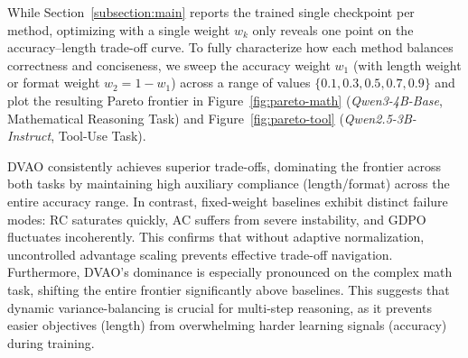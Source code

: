 \documentclass{llmxive}
\begin{document}
While Section~\ref{subsection:main} reports the trained single checkpoint per method, optimizing with a single weight $w_k$ only reveals one point on the accuracy--length trade-off curve. To fully characterize how each method balances correctness and conciseness, we sweep the accuracy weight $w_1$ (with length weight or format weight $w_2 = 1 - w_1$) across a range of values $\{0.1, 0.3, 0.5, 0.7, 0.9\}$ and plot the resulting Pareto frontier in Figure~\ref{fig:pareto-math} (\textit{Qwen3-4B-Base}, Mathematical Reasoning Task) and Figure~\ref{fig:pareto-tool} (\textit{Qwen2.5-3B-Instruct}, Tool-Use Task).

DVAO consistently achieves superior trade-offs, dominating the frontier across both tasks by maintaining high auxiliary compliance (length/format) across the entire accuracy range. In contrast, fixed-weight baselines exhibit distinct failure modes: RC saturates quickly, AC suffers from severe instability, and GDPO fluctuates incoherently. This confirms that without adaptive normalization, uncontrolled advantage scaling prevents effective trade-off navigation. Furthermore, DVAO's dominance is especially pronounced on the complex math task, shifting the entire frontier significantly above baselines. This suggests that dynamic variance-balancing is crucial for multi-step reasoning, as it prevents easier objectives (length) from overwhelming harder learning signals (accuracy) during training.


\end{document}
